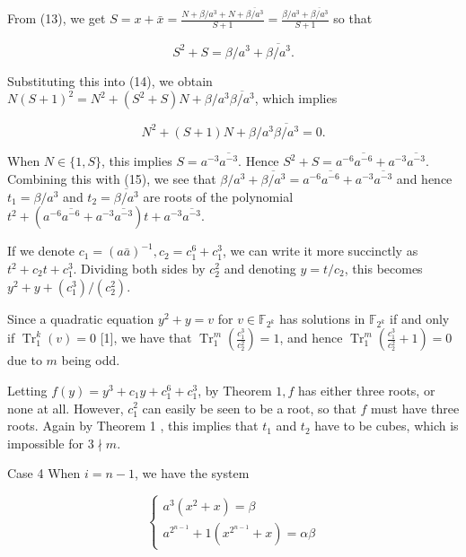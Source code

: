 \documentclass[10pt]{article}
\begin{document}
From (13), we get $S=x+\bar{x}=\frac{N+\beta / a^{3}+N+\overline{\beta / a^{3}}}{S+1}= \frac{\beta / a^{3}+\overline{\beta / a^{3}}}{S+1}$ so that


\begin{equation*}
S^{2}+S=\beta / a^{3}+\overline{\beta / a^{3}} . \tag{15}
\end{equation*}


Substituting this into (14), we obtain $N(S+1)^{2}=N^{2}+ \left(S^{2}+S\right) N+\beta / a^{3} \overline{\beta / a^{3}}$, which implies

$$
N^{2}+(S+1) N+\beta / a^{3} \overline{\beta / a^{3}}=0 .
$$

When $N \in\{1, S\}$, this implies $S=a^{-3} \overline{a^{-3}}$. Hence $S^{2}+ S=a^{-6} \overline{a^{-6}}+a^{-3} \overline{a^{-3}}$. Combining this with (15), we see that $\beta / a^{3}+\overline{\beta / a^{3}}=a^{-6} \overline{a^{-6}}+a^{-3} \overline{a^{-3}}$ and hence $t_{1}=\beta / a^{3}$ and $t_{2}=\overline{\beta / a^{3}}$ are roots of the polynomial $t^{2}+\left(a^{-6} \overline{a^{-6}}+\right. \left.a^{-3} \overline{a^{-3}}\right) t+a^{-3} \overline{a^{-3}}$.

If we denote $c_{1}=(a \bar{a})^{-1}, c_{2}=c_{1}^{6}+c_{1}^{3}$, we can write it more succinctly as $t^{2}+c_{2} t+c_{1}^{3}$. Dividing both sides by $c_{2}^{2}$ and denoting $y=t / c_{2}$, this becomes $y^{2}+y+\left(c_{1}^{3}\right) /\left(c_{2}^{2}\right)$.

Since a quadratic equation $y^{2}+y=v$ for $v \in \mathbb{F}_{2^{k}}$ has solutions in $\mathbb{F}_{2^{k}}$ if and only if $\operatorname{Tr}_{1}^{k}(v)=0$ [1], we have that $\operatorname{Tr}_{1}^{m}\left(\frac{c_{1}^{3}}{c_{2}^{2}}\right)=1$, and hence $\operatorname{Tr}_{1}^{m}\left(\frac{c_{1}^{3}}{c_{2}^{2}}+1\right)=0$ due to $m$ being odd.

Letting $f(y)=y^{3}+c_{1} y+c_{1}^{6}+c_{1}^{3}$, by Theorem $1, f$ has either three roots, or none at all. However, $c_{1}^{2}$ can easily be seen to be a root, so that $f$ must have three roots. Again by Theorem 1 , this implies that $t_{1}$ and $t_{2}$ have to be cubes, which is impossible for $3 \nmid m$.

Case 4 When $i=n-1$, we have the system

$$
\left\{\begin{array}{l}
a^{3}\left(x^{2}+x\right)=\beta \\
a^{2^{n-1}}+1\left(x^{2^{n-1}}+x\right)=\alpha \beta
\end{array}\right.
$$
\end{document}
